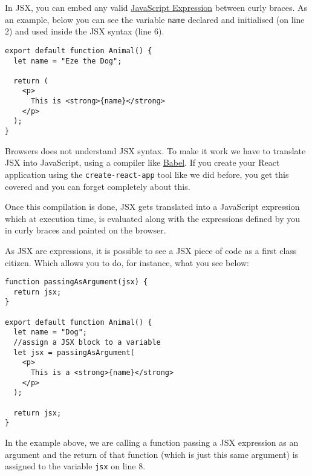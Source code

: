 \documentclass[a4paper, oneside, titlepage, 12pt]{book}
\begin{document}
In JSX, you can embed any valid \href{https://developer.mozilla.org/en-US/docs/Web/JavaScript/Guide/Expressions_and_Operators#expressions}{JavaScript Expression} between curly braces. As an example, below you can see the variable \texttt{name} declared and initialised (on line 2) and used inside the JSX syntax (line 6). 

\begin{verbatim}
export default function Animal() {
  let name = "Eze the Dog";

  return (
    <p>
      This is <strong>{name}</strong>
    </p>
  );
}
\end{verbatim}

Browsers does not understand JSX syntax. To make it work we have to translate JSX into JavaScript, using a compiler like \href{https://babeljs.io/}{Babel}. If you create your React application using the \texttt{create-react-app} tool like we did before, you get this covered and you can forget completely about this.
\newline 

Once this compilation is done, JSX gets translated into a JavaScript expression which at execution time, is evaluated along with the expressions defined by you in curly braces and painted on the browser.
\newline 

As JSX are expressions, it is possible to see a JSX piece of code as a first class citizen. Which allows you to do, for instance, what you see below:

\begin{verbatim}
function passingAsArgument(jsx) {
  return jsx;
}

export default function Animal() {
  let name = "Dog";
  //assign a JSX block to a variable
  let jsx = passingAsArgument(
    <p>
      This is a <strong>{name}</strong>
    </p>
  );

  return jsx;
}
\end{verbatim}

In the example above, we are calling a function passing a JSX expression as an argument and the return of that function (which is just this same argument) is assigned to the variable \texttt{jsx} on line 8.
\newline
\end{document}
